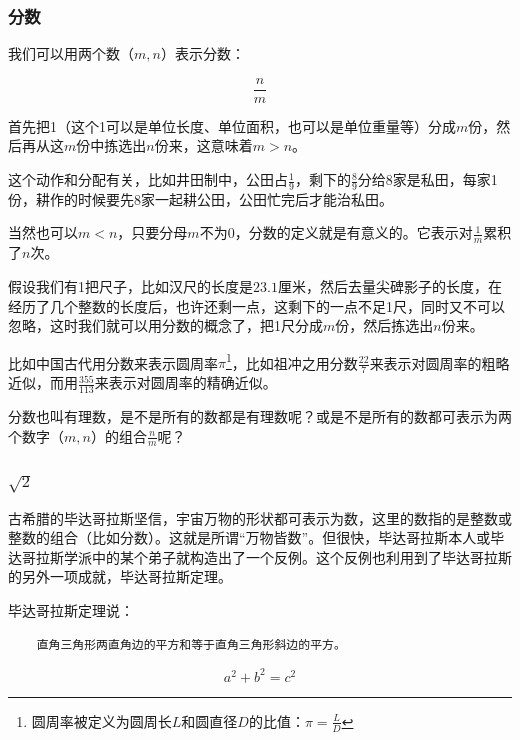 \subsubsection{分数}

我们可以用两个数（$m,n$）表示分数：

\begin{equation*}
\frac{n}{m}
\end{equation*}

首先把1（这个1可以是单位长度、单位面积，也可以是单位重量等）分成$m$份，然后再从这$m$份中拣选出$n$份来，这意味着$m > n$。

这个动作和分配有关，比如井田制中，公田占$\frac{1}{9}$，剩下的$\frac{8}{9}$分给8家是私田，每家1份，耕作的时候要先8家一起耕公田，公田忙完后才能治私田。

当然也可以$m < n$，只要分母$m$不为0，分数的定义就是有意义的。它表示对$\frac{1}{m}$累积了$n$次。

假设我们有1把尺子，比如汉尺的长度是$23.1$厘米，然后去量尖碑影子的长度，在经历了几个整数的长度后，也许还剩一点，这剩下的一点不足1尺，同时又不可以忽略，这时我们就可以用分数的概念了，把1尺分成$m$份，然后拣选出$n$份来。

比如中国古代用分数来表示圆周率$\pi$\footnote{圆周率被定义为圆周长$L$和圆直径$D$的比值：$\pi = \frac{L}{D}$}，比如祖冲之用分数$\frac{22}{7}$来表示对圆周率的粗略近似，而用$\frac{355}{113}$来表示对圆周率的精确近似。

分数也叫有理数，是不是所有的数都是有理数呢？或是不是所有的数都可表示为两个数字（$m,n$）的组合$\frac{n}{m}$呢？

\subsubsection{$\sqrt{2}$}


古希腊的毕达哥拉斯坚信，宇宙万物的形状都可表示为数，这里的数指的是整数或整数的组合（比如分数）。这就是所谓“万物皆数”。但很快，毕达哥拉斯本人或毕达哥拉斯学派中的某个弟子就构造出了一个反例。这个反例也利用到了毕达哥拉斯的另外一项成就，毕达哥拉斯定理。

毕达哥拉斯定理说：

\begin{verbatim}
    直角三角形两直角边的平方和等于直角三角形斜边的平方。
\end{verbatim}

\begin{equation}
a^2 + b^2 = c^2
\end{equation}

